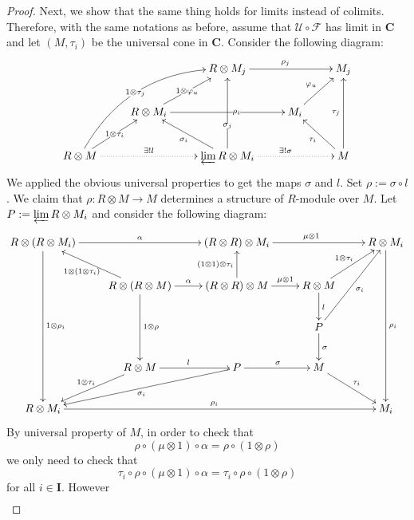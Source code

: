 \begin{refsection}
\begin{proof}
Next, we show that the same thing holds for limits instead of colimits. Therefore, with the same notations as before, assume that $\mathcal U \circ \mathcal F$ has limit in $\mathbf C$ and let $(M, \tau_i)$ be the universal cone in $\mathbf C$. Consider the following diagram:
\begin{equation*}
\xymatrix { & & R \otimes M_j \ar[rr]^{\rho_j} & & M_j \\ &  R \otimes M_i \ar[rr]|(.6){\rho_i} \ar[ur]|-{1 \otimes \varphi_u} & & M_i \ar[ur]^{\varphi_u} \\ R \otimes M \ar[ur]|-{1 \otimes \tau_i} \ar@/^2pc/[uurr]|-{1 \otimes \tau_j} \ar@{.>}[rr]^-{\exists ! l} & & \varprojlim R \otimes M_i \ar[ul]^{\sigma_i} \ar[uu]|(.35){\sigma_j} \ar@{.>}[rr]^{\exists ! \sigma} & & M \ar[ul]^{\tau_i} \ar[uu]^{\tau_j} }
\end{equation*}
We applied the obvious universal properties to get the maps $\sigma$ and $l$. Set $\rho := \sigma \circ l$. We claim that $\rho \colon R \otimes M \to M$ determines a structure of $R$-module over $M$. Let $P := \varprojlim R \otimes M_i$ and consider the following diagram:
\begin{equation*}
\xymatrix { R \otimes (R \otimes M_i) \ar[rr]^\alpha \ar[dddd]^{1 \otimes \rho_i} & & (R \otimes R) \otimes M_i \ar[rr]^{\mu \otimes 1} & & R \otimes M_i \ar[dddd]^{\rho_i} \\ & R \otimes (R \otimes M) \ar[ul]^{1 \otimes (1 \otimes \tau_i)} \ar[dd]^{1 \otimes \rho} \ar[r]^\alpha & (R \otimes R) \otimes M \ar[u]^{(1 \otimes 1) \otimes \tau_i} \ar[r]^-{\mu \otimes 1} & R \otimes M  \ar[ur]^{1 \otimes \tau_i} \ar[d]^l \\ & & & P \ar[d]^{\sigma} \ar[uur]_{\sigma_i} \\ & R \otimes M \ar[dl]_{1 \otimes \tau_i} \ar[r]^l & P \ar[dll]^{\sigma_i} \ar[r]^{\sigma} & M \ar[dr]^{\tau_i} \\ R \otimes M_i \ar[rrrr]^{\rho_i} & & & & M_i }
\end{equation*}
By universal property of $M$, in order to check that
\begin{equation*}
\rho \circ (\mu \otimes 1) \circ \alpha = \rho \circ (1 \otimes \rho)
\end{equation*}
we only need to check that
\begin{equation*}
\tau_i \circ \rho \circ(\mu \otimes 1) \circ \alpha = \tau_i \circ \rho \circ (1 \otimes \rho)
\end{equation*}
for all $i \in \mathbf I$. However
\begin{align*}

\end{align*}
\end{proof}
\end{refsection}
